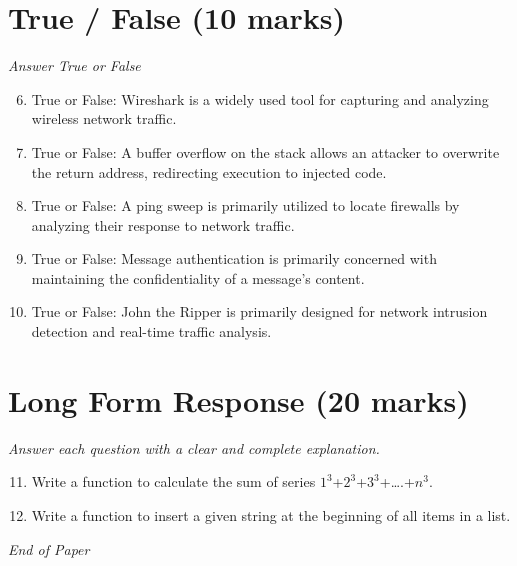 \documentclass[12pt]{article}
\begin{document}
\section*{True / False (10 marks)}
\textit{Answer True or False}
\begin{enumerate}[label=\arabic*.]
\setcounter{enumi}{5}
\item True or False: Wireshark is a widely used tool for capturing and analyzing wireless network traffic.
\item True or False: A buffer overflow on the stack allows an attacker to overwrite the return address, redirecting execution to injected code.
\item True or False: A ping sweep is primarily utilized to locate firewalls by analyzing their response to network traffic.
\item True or False: Message authentication is primarily concerned with maintaining the confidentiality of a message's content.
\item True or False: John the Ripper is primarily designed for network intrusion detection and real-time traffic analysis.
\end{enumerate}

\section*{Long Form Response (20 marks)}
\textit{Answer each question with a clear and complete explanation.}
\begin{enumerate}[label=\arabic*.]
\setcounter{enumi}{10}
\item Write a function to calculate the sum of series $1^3$+$2^3$+$3^3$+….+$n^3$.
\item Write a function to insert a given string at the beginning of all items in a list.
\end{enumerate}

\vfill
\noindent\textit{End of Paper}
\end{document}
